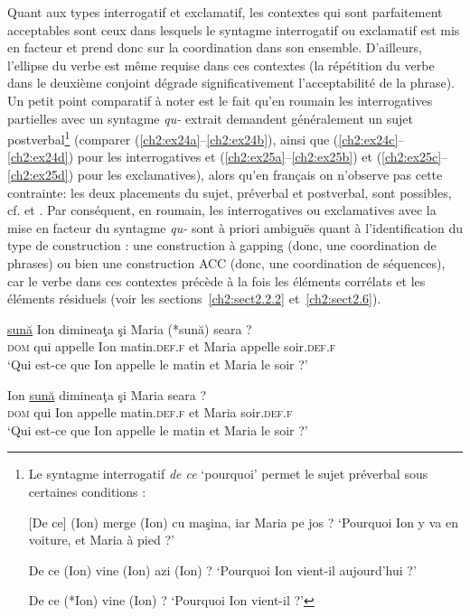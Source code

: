Quant aux types interrogatif et exclamatif, les contextes qui sont parfaitement acceptables sont ceux dans lesquels le syntagme interrogatif ou exclamatif est mis en facteur et prend donc  sur la coordination dans son ensemble. D’ailleurs, l’ellipse du verbe est même requise dans ces contextes (la répétition du verbe dans le deuxième conjoint dégrade significativement l’acceptabilité de la phrase). Un petit point comparatif à noter est le fait qu’en roumain les interrogatives partielles avec un syntagme \textit{qu-} extrait demandent généralement un sujet postverbal\footnote{
 Le syntagme interrogatif \textit{de ce} ‘pourquoi’ permet le sujet préverbal sous certaines conditions :

\ea
\ea {} [De ce] (Ion) merge (Ion) cu maşina, iar Maria pe jos ?
\glt ‘Pourquoi Ion y va en voiture, et Maria à pied ?’

\ex De ce (Ion) vine (Ion) azi (Ion) ?
\glt ‘Pourquoi Ion vient-il aujourd’hui ?’

\ex De ce (*Ion) vine (Ion) ? 
\glt ‘Pourquoi Ion vient-il ?’
\z
\z
} (comparer (\ref{ch2:ex24a}--\ref{ch2:ex24b}), ainsi que (\ref{ch2:ex24c}--\ref{ch2:ex24d}) pour les interrogatives et (\ref{ch2:ex25a}--\ref{ch2:ex25b}) et (\ref{ch2:ex25c}--\ref{ch2:ex25d}) pour les exclamatives), alors qu’en français on n’observe pas cette contrainte: les deux placements du sujet, préverbal et postverbal, sont possibles, cf.  et . Par conséquent, en roumain, les interrogatives ou exclamatives avec la mise en facteur du syntagme \textit{qu-} sont à priori ambiguës quant à l’identification du type de construction : une construction à gapping (donc, une coordination de phrases) ou bien une construction ACC (donc, une coordination de séquences), car le verbe dans ces contextes précède à la fois les éléments corrélats et les éléments résiduels (voir les sections~\ref{ch2:sect2.2.2} et~\ref{ch2:sect2.6}). 

\ea
\ea {}
\gll [Pe  cine]  \uline{sună}  Ion  dimineaţa  şi  Maria  (*sună)  {seara ?} \label{ch2:ex24a}\\
\textsc{dom}  qui  appelle  Ion  matin\textsc{.def.f}  et  Maria  appelle   soir.\textsc{def.f}\\ 
\glt ‘Qui est-ce que Ion appelle le matin et Maria le soir ?’    

\ex  
\gll *[Pe  cine]  Ion \uline{sună}  dimineaţa  şi  Maria  {seara ?} \label{ch2:ex24b}\\
\textsc{dom}  qui  Ion  appelle  matin\textsc{.def.f}  et  Maria  soir\textsc{.def.f}\\
\glt  ‘Qui est-ce que Ion appelle le matin et Maria le soir ?’

